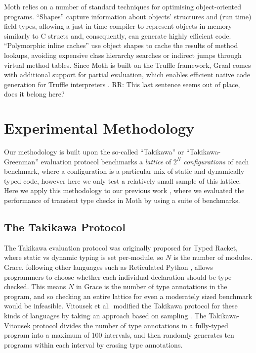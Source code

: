 \documentclass[sigplan,10pt,review,screen]{acmart}\settopmatter{printfolios=true}
\newcommand{\RR}[1]{{\color{red}RR: #1}}
\begin{document}
Moth relies on a number of standard techniques for optimising
object-oriented programs.
``Shapes'' \citep{woss2014object} capture information about objects'
structures and (run time) 
field types, allowing a just-in-time compiler to
represent objects in memory similarly to C structs and, consequently,
can generate highly efficient code.
``Polymorphic inline caches''
\citep{Hoelzle:91:PIC} use object shapes to cache the results of
method lookups, avoiding expensive class hierarchy searches or
indirect jumps through virtual method tables. 
Since Moth is built on the Truffle framework,
Graal comes with  additional support for partial evaluation,
which enables efficient native code generation for
Truffle interpreters \citep{Wurthinger:2017:PPE}.
\RR{This last sentence seems out of place, does it belong here?}

\section{Experimental Methodology}
Our methodology is built upon the so-called ``Takikawa'' or ``Takikawa-Greenman'' evaluation protocol \cite{Takikawa2016,Greenman2019jfp} benchmarks a \emph{lattice} of $2^N$ \emph{configurations} of each benchmark, where a configuration is a particular mix of static and dynamically typed code, however here we only test a relatively small sample of this lattice. Here we apply this methodology to our previous work \cite{roberts-and-co-ecoop-2019}, where we evaluated the performance of transient type checks in Moth by using a suite of benchmarks.

\subsection{The Takikawa Protocol}
The Takikawa evaluation protocol was originally proposed for Typed
Racket, where static vs dynamic typing is set per-module, so $N$ is
the number of modules. Grace, following other languages such as
Reticulated Python \cite{reticPython2014,monotonic2015,Vitousek2017},
allows programmers to choose whether each individual declaration should be type-checked. This means $N$ in Grace is the number of type annotations in the program, and so
checking an entire lattice for even a moderately sized benchmark would be infeasible.  Vitousek et al.\ modified the Takikawa protocol for
these kinds of languages by taking an approach based on sampling
\cite{vitousek-transient-arXive-2019}.  The Takikawa-Vitousek protocol
divides the number of type annotations in a fully-typed program into
a maximum of 100 intervals, and then randomly generates ten programs within
each interval by erasing type annotations.
\end{document}
